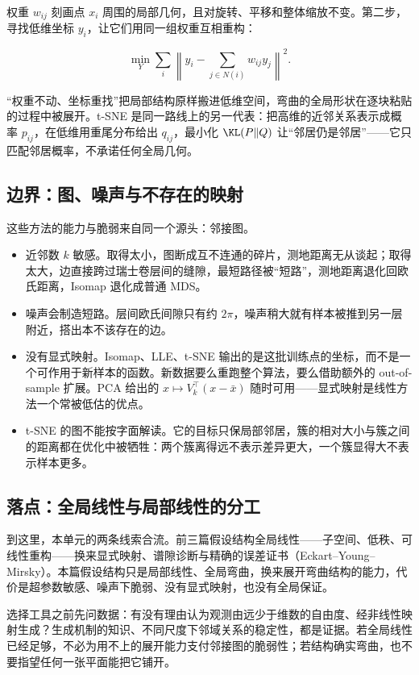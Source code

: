 权重 \(w_{ij}\) 刻画点 \(x_i\) 周围的局部几何，且对旋转、平移和整体缩放不变。第二步，寻找低维坐标 \(y_i\)，让它们用同一组权重互相重构：

\[
\min_{Y}\sum_i
\left\|y_i-\sum_{j\in N(i)}w_{ij}y_j\right\|^2.
\]

``权重不动、坐标重找''把局部结构原样搬进低维空间，弯曲的全局形状在逐块粘贴的过程中被展开。t-SNE 是同一路线上的另一代表：把高维的近邻关系表示成概率 \(p_{ij}\)，在低维用重尾分布给出 \(q_{ij}\)，最小化 \(\KL(P\|Q)\) 让``邻居仍是邻居''——它只匹配邻居概率，不承诺任何全局几何。

\subsection{边界：图、噪声与不存在的映射}

这些方法的能力与脆弱来自同一个源头：邻接图。

\begin{itemize}
\tightlist
\item
  近邻数 \(k\) 敏感。取得太小，图断成互不连通的碎片，测地距离无从谈起；取得太大，边直接跨过瑞士卷层间的缝隙，最短路径被``短路''，测地距离退化回欧氏距离，Isomap 退化成普通 MDS。
\item
  噪声会制造短路。层间欧氏间隙只有约 \(2\pi\)，噪声稍大就有样本被推到另一层附近，搭出本不该存在的边。
\item
  没有显式映射。Isomap、LLE、t-SNE 输出的是这批训练点的坐标，而不是一个可作用于新样本的函数。新数据要么重跑整个算法，要么借助额外的 out-of-sample 扩展。PCA 给出的 \(x\mapsto V_k^\top(x-\bar x)\) 随时可用——显式映射是线性方法一个常被低估的优点。
\item
  t-SNE 的图不能按字面解读。它的目标只保局部邻居，簇的相对大小与簇之间的距离都在优化中被牺牲：两个簇离得远不表示差异更大，一个簇显得大不表示样本更多。
\end{itemize}

\subsection{落点：全局线性与局部线性的分工}

到这里，本单元的两条线索合流。前三篇假设结构全局线性——子空间、低秩、可线性重构——换来显式映射、谱隙诊断与精确的误差证书（Eckart--Young--Mirsky）。本篇假设结构只是局部线性、全局弯曲，换来展开弯曲结构的能力，代价是超参数敏感、噪声下脆弱、没有显式映射，也没有全局保证。

选择工具之前先问数据：有没有理由认为观测由远少于维数的自由度、经非线性映射生成？生成机制的知识、不同尺度下邻域关系的稳定性，都是证据。若全局线性已经足够，不必为用不上的展开能力支付邻接图的脆弱性；若结构确实弯曲，也不要指望任何一张平面能把它铺开。

